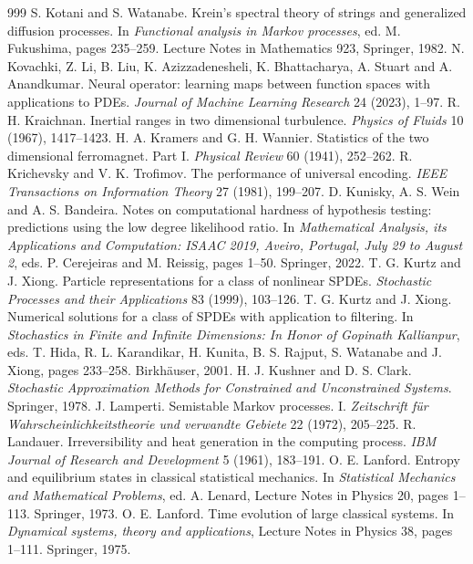 \begin{thebibliography}{999}
 S. Kotani and S. Watanabe. Krein's spectral theory of strings and generalized diffusion processes. In \emph{Functional analysis in Markov processes}, ed. M. Fukushima, pages 235--259. Lecture Notes in Mathematics 923, Springer, 1982.
 N. Kovachki, Z. Li, B. Liu, K. Azizzadenesheli, K. Bhattacharya, A. Stuart and A. Anandkumar. Neural operator: learning maps between function spaces with applications to PDEs. \emph{Journal of Machine Learning Research} 24 (2023), 1--97.
 R. H. Kraichnan. Inertial ranges in two dimensional turbulence. \emph{Physics of Fluids} 10 (1967), 1417--1423.
 H. A. Kramers and G. H. Wannier. Statistics of the two dimensional ferromagnet. Part I. \emph{Physical Review} 60 (1941), 252--262.
 R. Krichevsky and V. K. Trofimov. The performance of universal encoding. \emph{IEEE Transactions on Information Theory} 27 (1981), 199--207.
 D. Kunisky, A. S. Wein and A. S. Bandeira. Notes on computational hardness of hypothesis testing: predictions using the low degree likelihood ratio. In \emph{Mathematical Analysis, its Applications and Computation: ISAAC 2019, Aveiro, Portugal, July 29 to August 2}, eds. P. Cerejeiras and M. Reissig, pages 1--50. Springer, 2022.
 T. G. Kurtz and J. Xiong. Particle representations for a class of nonlinear SPDEs. \emph{Stochastic Processes and their Applications} 83 (1999), 103--126.
 T. G. Kurtz and J. Xiong. Numerical solutions for a class of SPDEs with application to filtering. In \emph{Stochastics in Finite and Infinite Dimensions: In Honor of Gopinath Kallianpur}, eds. T. Hida, R. L. Karandikar, H. Kunita, B. S. Rajput, S. Watanabe and J. Xiong, pages 233--258. Birkh\"auser, 2001.
 H. J. Kushner and D. S. Clark. \emph{Stochastic Approximation Methods for Constrained and Unconstrained Systems}. Springer, 1978.
 J. Lamperti. Semistable Markov processes. I. \emph{Zeitschrift f\"ur Wahrscheinlichkeitstheorie und verwandte Gebiete} 22 (1972), 205--225.
 R. Landauer. Irreversibility and heat generation in the computing process. \emph{IBM Journal of Research and Development} 5 (1961), 183--191.
 O. E. Lanford. Entropy and equilibrium states in classical statistical mechanics. In \emph{Statistical Mechanics and Mathematical Problems}, ed. A. Lenard, Lecture Notes in Physics 20, pages 1--113. Springer, 1973.
 O. E. Lanford. Time evolution of large classical systems. In \emph{Dynamical systems, theory and applications}, Lecture Notes in Physics 38, pages 1--111. Springer, 1975.

\end{thebibliography}
